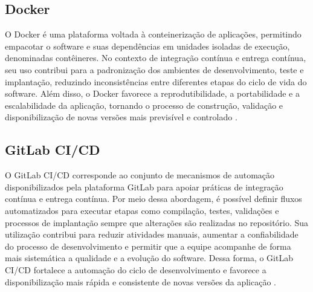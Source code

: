 \subsection{Docker}
O Docker é uma plataforma voltada à conteinerização de aplicações, permitindo empacotar o software e suas dependências em unidades isoladas de execução, denominadas contêineres. No contexto de integração contínua e entrega contínua, seu uso contribui para a padronização dos ambientes de desenvolvimento, teste e implantação, reduzindo inconsistências entre diferentes etapas do ciclo de vida do software. Além disso, o Docker favorece a reprodutibilidade, a portabilidade e a escalabilidade da aplicação, tornando o processo de construção, validação e disponibilização de novas versões mais previsível e controlado \cite{docker2026}.

\subsection{GitLab CI/CD}
O GitLab CI/CD corresponde ao conjunto de mecanismos de automação disponibilizados pela plataforma GitLab para apoiar práticas de integração contínua e entrega contínua. Por meio dessa abordagem, é possível definir fluxos automatizados para executar etapas como compilação, testes, validações e processos de implantação sempre que alterações são realizadas no repositório. Sua utilização contribui para reduzir atividades manuais, aumentar a confiabilidade do processo de desenvolvimento e permitir que a equipe acompanhe de forma mais sistemática a qualidade e a evolução do software. Dessa forma, o GitLab CI/CD fortalece a automação do ciclo de desenvolvimento e favorece a disponibilização mais rápida e consistente de novas versões da aplicação \cite{gitlabcicd2026}.
